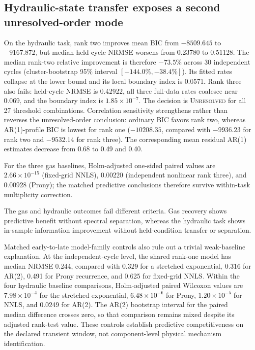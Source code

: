 \documentclass[11pt]{article}
\newcommand{\indet}{\textsc{Unresolved}}
\begin{document}
\subsection{Hydraulic-state transfer exposes a second unresolved-order mode}
On the hydraulic task, rank two improves mean BIC from $-8509.645$ to $-9167.872$, but median held-cycle NRMSE worsens from 0.23780 to 0.51128. The median rank-two relative improvement is therefore $-73.5\%$ across 30 independent cycles (cluster-bootstrap 95\% interval $[-144.0\%,-38.4\%]$). Its fitted rates collapse at the lower bound and its local boundary index is 0.0571. Rank three also fails: held-cycle NRMSE is 0.42922, all three full-data rates coalesce near 0.069, and the boundary index is $1.85\times10^{-7}$. The decision is \indet{} for all 27 threshold combinations. Correlation sensitivity strengthens rather than reverses the unresolved-order conclusion: ordinary BIC favors rank two, whereas AR(1)-profile BIC is lowest for rank one ($-10208.35$, compared with $-9936.23$ for rank two and $-9532.14$ for rank three). The corresponding mean residual AR(1) estimates decrease from 0.68 to 0.49 and 0.40.

 For the three gas baselines, Holm-adjusted one-sided paired values are $2.66\times10^{-15}$ (fixed-grid NNLS), 0.00220 (independent nonlinear rank three), and 0.00928 (Prony); the matched predictive conclusions therefore survive within-task multiplicity correction.

The gas and hydraulic outcomes fail different criteria. Gas recovery shows predictive benefit without spectral separation, whereas the hydraulic task shows in-sample information improvement without held-condition transfer or separation.

Matched early-to-late model-family controls also rule out a trivial weak-baseline explanation. At the independent-cycle level, the shared rank-one model has median NRMSE 0.244, compared with 0.329 for a stretched exponential, 0.316 for AR(2), 0.491 for Prony recurrence, and 0.625 for fixed-grid NNLS. Within the four hydraulic baseline comparisons, Holm-adjusted paired Wilcoxon values are $7.98\times10^{-4}$ for the stretched exponential, $6.48\times10^{-6}$ for Prony, $1.20\times10^{-5}$ for NNLS, and 0.0249 for AR(2). The AR(2) bootstrap interval for the paired median difference crosses zero, so that comparison remains mixed despite its adjusted rank-test value. These controls establish predictive competitiveness on the declared transient window, not component-level physical mechanism identification.
\end{document}
